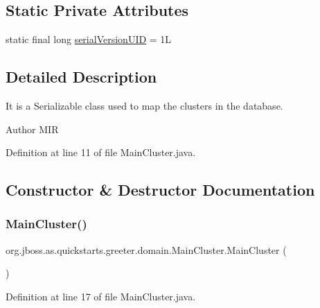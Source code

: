 \subsection*{Static Private Attributes}
\begin{DoxyCompactItemize}
\item 
static final long \hyperlink{classorg_1_1jboss_1_1as_1_1quickstarts_1_1greeter_1_1domain_1_1_main_cluster_ab6138926de4b47b52dde6a9536f515f8}{serial\+Version\+U\+ID} = 1L
\end{DoxyCompactItemize}


\subsection{Detailed Description}
It is a Serializable class used to map the clusters in the database. 

\begin{DoxyAuthor}{Author}
M\+IR 
\end{DoxyAuthor}


Definition at line 11 of file Main\+Cluster.\+java.



\subsection{Constructor \& Destructor Documentation}
\mbox{\label{classorg_1_1jboss_1_1as_1_1quickstarts_1_1greeter_1_1domain_1_1_main_cluster_aa935625c3b4c22900c39842ddaa6c2ec}} 
\subsubsection{\texorpdfstring{Main\+Cluster()}{MainCluster()}}
{\footnotesize\ttfamily org.\+jboss.\+as.\+quickstarts.\+greeter.\+domain.\+Main\+Cluster.\+Main\+Cluster (\begin{DoxyParamCaption}{ }\end{DoxyParamCaption})}



Definition at line 17 of file Main\+Cluster.\+java.



